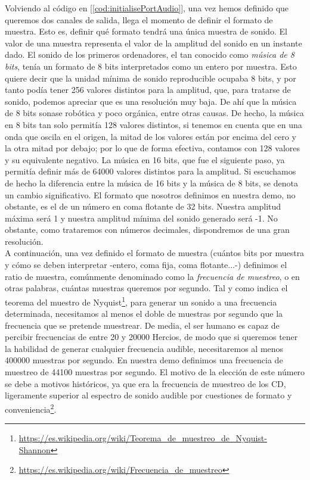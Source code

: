 Volviendo al código en [\ref{cod:initialisePortAudio}], una vez hemos definido que queremos dos canales de salida, llega el momento de definir el formato de muestra. Esto es, definir qué formato tendrá una única muestra de sonido. El valor de una muestra representa el valor de la amplitud del sonido en un instante dado. El sonido de los primeros ordenadores, el tan conocido como \emph{música de 8 bits}, tenía un formato de 8 bits interpretados como un entero por muestra. Esto quiere decir que la unidad mínima de sonido reproducible ocupaba 8 bits, y por tanto podía tener 256 valores distintos para la amplitud, que, para tratarse de sonido, podemos apreciar que es una resolución muy baja. De ahí que la música de 8 bits sonase robótica y poco orgánica, entre otras causas. De hecho, la música en 8 bits tan solo permitía 128 valores distintos, si tenemos en cuenta que en una onda que oscila en el origen, la mitad de los valores están por encima del cero y la otra mitad por debajo; por lo que de forma efectiva, contamos con 128 valores y su equivalente negativo. La música en 16 bits, que fue el siguiente paso, ya permitía definir más de 64000 valores distintos para la amplitud. Si escuchamos de hecho la diferencia entre la música de 16 bits y la música de 8 bits, se denota un cambio significativo. El formato que nosotros definimos en nuestra demo, no obstante, es el de un número en coma flotante de 32 bits. Nuestra amplitud máxima será 1 y nuestra amplitud mínima del sonido generado será -1. No obstante, como trataremos con números decimales, dispondremos de una gran resolución.\\

A continuación, una vez definido el formato de muestra (cuántos bits por muestra y cómo se deben interpretar -entero, coma fija, coma flotante...-) definimos el ratio de muestra, comúnmente denominado como la \emph{frecuencia de muestreo}, o en otras palabras, cuántas muestras queremos por segundo. Tal y como indica el teorema del muestro de Nyquist\footnote{\url{https://es.wikipedia.org/wiki/Teorema_de_muestreo_de_Nyquist-Shannon}}, para generar un sonido a una frecuencia determinada, necesitamos al menos el doble de muestras por segundo que la frecuencia que se pretende muestrear. De media, el ser humano es capaz de percibir frecuencias de entre 20 y 20000 Hercios, de modo que si queremos tener la habilidad de generar cualquier frecuencia audible, necesitaremos al menos 400000 muestras por segundo. En nuestra demo definimos una frecuencia de muestreo de 44100 muestras por segundo. El motivo de la elección de este número se debe a motivos históricos, ya que era la frecuencia de muestreo de los CD, ligeramente superior al espectro de sonido audible por cuestiones de formato y conveniencia\footnote{\url{https://es.wikipedia.org/wiki/Frecuencia_de_muestreo}}.\\

